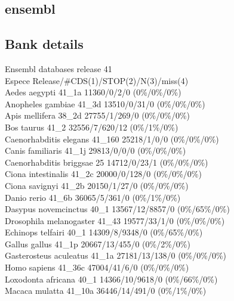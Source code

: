 \documentclass{article}
\begin{document}
\begin{Schunk}
\section{ ensembl }
\subsection{Bank details}
Ensembl databases release 41\\
Espece                                  Release/\#CDS(1)/STOP(2)/N(3)/miss(4)\\
Aedes aegypti                           41\_1a 11360/0/2/0 (0\%/0\%/0\%)\\
Anopheles gambiae                       41\_3d 13510/0/31/0 (0\%/0\%/0\%)\\
Apis mellifera                          38\_2d 27755/1/269/0 (0\%/0\%/0\%)\\
Bos taurus                              41\_2 32556/7/620/12 (0\%/1\%/0\%)\\
Caenorhabditis elegans                  41\_160 25218/1/0/0 (0\%/0\%/0\%)\\
Canis familiaris                        41\_1j 29813/0/0/0 (0\%/0\%/0\%)\\
Caenorhabditis briggsae                 25 14712/0/23/1 (0\%/0\%/0\%)\\
Ciona intestinalis                      41\_2c 20000/0/128/0 (0\%/0\%/0\%)\\
Ciona savignyi                          41\_2b 20150/1/27/0 (0\%/0\%/0\%)\\
Danio rerio                             41\_6b 36065/5/361/0 (0\%/1\%/0\%)\\
Dasypus novemcinctus                    40\_1 13567/12/8857/0 (0\%/65\%/0\%)\\
Drosophila melanogaster                 41\_43 19577/33/1/0 (0\%/0\%/0\%)\\
Echinops telfairi                       40\_1 14309/8/9348/0 (0\%/65\%/0\%)\\
Gallus gallus                           41\_1p 20667/13/455/0 (0\%/2\%/0\%)\\
Gasterosteus aculeatus                  41\_1a 27181/13/138/0 (0\%/0\%/0\%)\\
Homo sapiens                            41\_36c 47004/41/6/0 (0\%/0\%/0\%)\\
Loxodonta africana                      40\_1 14366/10/9618/0 (0\%/66\%/0\%)\\
Macaca mulatta                          41\_10a 36446/14/491/0 (0\%/1\%/0\%)\\

\end{Schunk}
\end{document}
